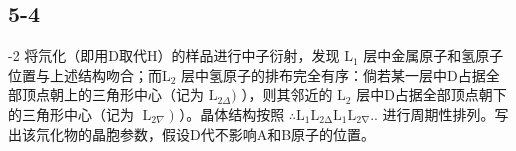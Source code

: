 \subsection*{5-4}
-2 将氘化（即⽤D取代H）的样品进⾏中⼦衍射，发现 $\mathrm { L _ { 1 } }$ 层中⾦属原⼦和氢原⼦位置与上述结构吻合；⽽$\mathrm { L } _ { 2 }$ 层中氢原⼦的排布完全有序：倘若某⼀层中D占据全部顶点朝上的三⻆形中⼼（记为 $\mathrm { L } _ { 2 \Delta } )$ ），则其邻近的 $\mathrm { L } _ { 2 }$ 层中D占据全部顶点朝下的三⻆形中⼼（记为 $\operatorname { L } _ { 2 \nabla } )$ ）。晶体结构按照 $\therefore \mathrm { L _ { 1 } L _ { 2 \Delta } L _ { 1 } L _ { 2 \nabla } } . .$ 进⾏周期性排列。写出该氘化物的晶胞参数，假设D代不影响A和B原⼦的位置。
